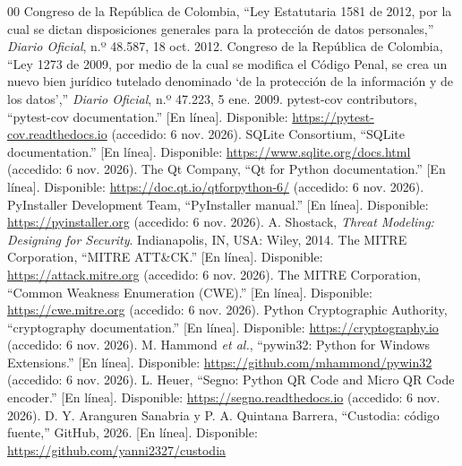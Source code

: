 \documentclass[conference]{IEEEtran}
\begin{document}
\begin{thebibliography}{00}
 Congreso de la República de Colombia, ``Ley Estatutaria 1581 de 2012, por la cual se dictan disposiciones generales para la protección de datos personales,'' \textit{Diario Oficial}, n.º 48.587, 18 oct. 2012.
 Congreso de la República de Colombia, ``Ley 1273 de 2009, por medio de la cual se modifica el Código Penal, se crea un nuevo bien jurídico tutelado denominado `de la protección de la información y de los datos','' \textit{Diario Oficial}, n.º 47.223, 5 ene. 2009.
 pytest-cov contributors, ``pytest-cov documentation.'' [En línea]. Disponible: \url{https://pytest-cov.readthedocs.io} (accedido: 6 nov. 2026).
 SQLite Consortium, ``SQLite documentation.'' [En línea]. Disponible: \url{https://www.sqlite.org/docs.html} (accedido: 6 nov. 2026).
 The Qt Company, ``Qt for Python documentation.'' [En línea]. Disponible: \url{https://doc.qt.io/qtforpython-6/} (accedido: 6 nov. 2026).
 PyInstaller Development Team, ``PyInstaller manual.'' [En línea]. Disponible: \url{https://pyinstaller.org} (accedido: 6 nov. 2026).
 A. Shostack, \textit{Threat Modeling: Designing for Security}. Indianapolis, IN, USA: Wiley, 2014.
 The MITRE Corporation, ``MITRE ATT\&CK.'' [En línea]. Disponible: \url{https://attack.mitre.org} (accedido: 6 nov. 2026).
 The MITRE Corporation, ``Common Weakness Enumeration (CWE).'' [En línea]. Disponible: \url{https://cwe.mitre.org} (accedido: 6 nov. 2026).
 Python Cryptographic Authority, ``cryptography documentation.'' [En línea]. Disponible: \url{https://cryptography.io} (accedido: 6 nov. 2026).
 M. Hammond \textit{et al.}, ``pywin32: Python for Windows Extensions.'' [En línea]. Disponible: \url{https://github.com/mhammond/pywin32} (accedido: 6 nov. 2026).
 L. Heuer, ``Segno: Python QR Code and Micro QR Code encoder.'' [En línea]. Disponible: \url{https://segno.readthedocs.io} (accedido: 6 nov. 2026).
 D. Y. Aranguren Sanabria y P. A. Quintana Barrera, ``Custodia: código fuente,'' GitHub, 2026. [En línea]. Disponible: \url{https://github.com/yanni2327/custodia}
\end{thebibliography}

\appendices
\end{document}
